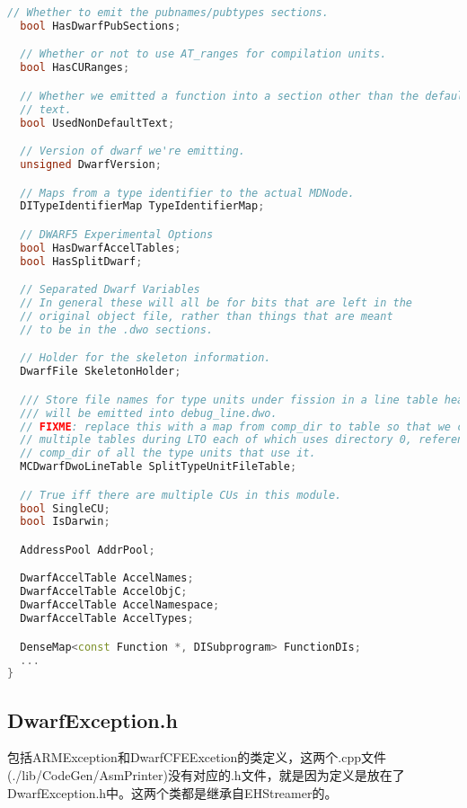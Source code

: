 \documentclass{ctexart}
\begin{document}
\begin{lstlisting}[language=C++]
  // Whether to emit the pubnames/pubtypes sections.
  bool HasDwarfPubSections;

  // Whether or not to use AT_ranges for compilation units.
  bool HasCURanges;

  // Whether we emitted a function into a section other than the default
  // text.
  bool UsedNonDefaultText;

  // Version of dwarf we're emitting.
  unsigned DwarfVersion;

  // Maps from a type identifier to the actual MDNode.
  DITypeIdentifierMap TypeIdentifierMap;

  // DWARF5 Experimental Options
  bool HasDwarfAccelTables;
  bool HasSplitDwarf;

  // Separated Dwarf Variables
  // In general these will all be for bits that are left in the
  // original object file, rather than things that are meant
  // to be in the .dwo sections.

  // Holder for the skeleton information.
  DwarfFile SkeletonHolder;

  /// Store file names for type units under fission in a line table header that
  /// will be emitted into debug_line.dwo.
  // FIXME: replace this with a map from comp_dir to table so that we can emit
  // multiple tables during LTO each of which uses directory 0, referencing the
  // comp_dir of all the type units that use it.
  MCDwarfDwoLineTable SplitTypeUnitFileTable;

  // True iff there are multiple CUs in this module.
  bool SingleCU;
  bool IsDarwin;

  AddressPool AddrPool;

  DwarfAccelTable AccelNames;
  DwarfAccelTable AccelObjC;
  DwarfAccelTable AccelNamespace;
  DwarfAccelTable AccelTypes;

  DenseMap<const Function *, DISubprogram> FunctionDIs;
  ...
}
\end{lstlisting}


\subsection{DwarfException.h}

包括ARMException和DwarfCFEExcetion的类定义，这两个.cpp文件(./lib/CodeGen/AsmPrinter)没有对应的.h文件，就是因为定义是放在了DwarfException.h中。这两个类都是继承自EHStreamer的。

\end{document}
